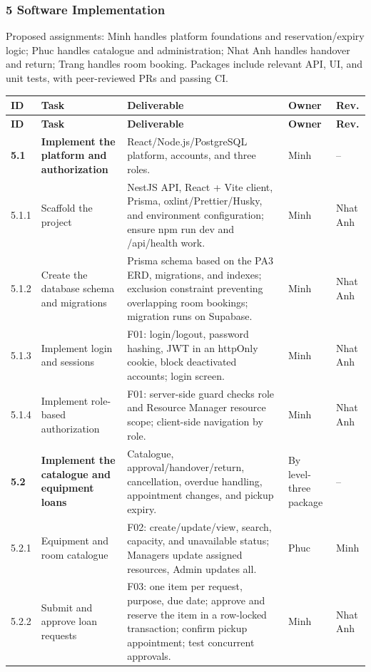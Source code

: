 \documentclass[11pt]{article}
\renewcommand{\arraystretch}{1.18}
\begin{document}
\subsubsection*{5 Software Implementation}
Proposed assignments: Minh handles platform foundations and reservation/expiry logic; Phuc handles catalogue and administration; Nhat Anh handles handover and return; Trang handles room booking. Packages include relevant API, UI, and unit tests, with peer-reviewed PRs and passing CI.
\footnotesize\setlength{\tabcolsep}{2.5pt}\renewcommand{\arraystretch}{1.08}
\begin{longtable}{@{}L{1.15cm}L{3.2cm}L{7.6cm}L{1.4cm}L{1.4cm}@{}}
\toprule
\textbf{ID} & \textbf{Task} & \textbf{Deliverable} & \textbf{Owner} & \textbf{Rev.} \\
\midrule\endfirsthead\toprule
\textbf{ID} & \textbf{Task} & \textbf{Deliverable} & \textbf{Owner} & \textbf{Rev.} \\
\midrule\endhead
\textbf{5.1} & \textbf{Implement the platform and authorization} & React/Node.js/PostgreSQL platform, accounts, and three roles. & Minh & -- \\
5.1.1 & Scaffold the project & NestJS API, React + Vite client, Prisma, oxlint/Prettier/Husky, and environment configuration; ensure npm run dev and /api/health work. & Minh & Nhat Anh \\
5.1.2 & Create the database schema and migrations & Prisma schema based on the PA3 ERD, migrations, and indexes; exclusion constraint preventing overlapping room bookings; migration runs on Supabase. & Minh & Nhat Anh \\
5.1.3 & Implement login and sessions & F01: login/logout, password hashing, JWT in an httpOnly cookie, block deactivated accounts; login screen. & Minh & Nhat Anh \\
5.1.4 & Implement role-based authorization & F01: server-side guard checks role and Resource Manager resource scope; client-side navigation by role. & Minh & Nhat Anh \\
\textbf{5.2} & \textbf{Implement the catalogue and equipment loans} & Catalogue, approval/handover/return, cancellation, overdue handling, appointment changes, and pickup expiry. & By level-three package & -- \\
5.2.1 & Equipment and room catalogue & F02: create/update/view, search, capacity, and unavailable status; Managers update assigned resources, Admin updates all. & Phuc & Minh \\
5.2.2 & Submit and approve loan requests & F03: one item per request, purpose, due date; approve and reserve the item in a row-locked transaction; confirm pickup appointment; test concurrent approvals. & Minh & Nhat Anh \\

\end{longtable}
\end{document}
